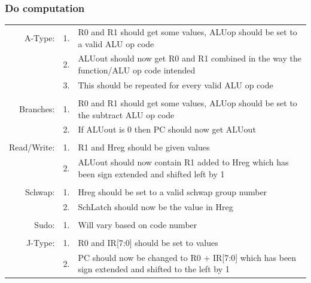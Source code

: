 \documentclass{article}
\begin{document}
		\subsubsection{Do computation}
			\begin{tabular}{ r  r  p{12.5cm} }
				    A-Type: & 1. & R0 and R1 should get some values, ALUop should be set to a valid ALU op code\\
				            & 2. & ALUout should now get R0 and R1 combined in the way the function/ALU op code intended\\
				            & 3. & This should be repeated for every valid ALU op code\\
				            &    & \\
				  Branches: & 1. & R0 and R1 should get some values, ALUop should be set to the subtract ALU op code\\
				            & 2. & If ALUout is 0 then PC should now get ALUout\\
				            &    & \\
				Read/Write: & 1. & R1 and Hreg should be given values\\
				            & 2. & ALUout should now contain R1 added to Hreg which has been sign extended and shifted left by 1\\
				            &    & \\
				    Schwap: & 1. & Hreg should be set to a valid schwap group number\\
				            & 2. & SchLatch should now be the value in Hreg\\
				            &    & \\
				      Sudo: & 1. & Will vary based on code number\\
				            &    & \\
				    J-Type: & 1. & R0 and IR[7:0] should be set to values\\
				            & 2. & PC should now be changed to R0 + IR[7:0] which has been sign extended and shifted to the left by 1 \\
			\end{tabular}
\end{document}
